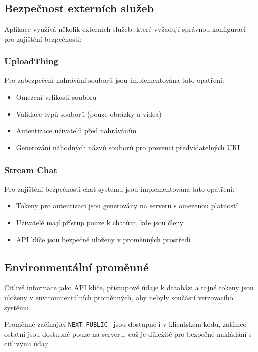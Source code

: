 \documentclass[12pt]{article}
\begin{document}
\subsection{Bezpečnost externích služeb}

Aplikace využívá několik externích služeb, které vyžadují správnou konfiguraci pro zajištění bezpečnosti:

\subsubsection{UploadThing}

Pro zabezpečení nahrávání souborů jsou implementována tato opatření:

\begin{itemize}
    \item Omezení velikosti souborů
    \item Validace typů souborů (pouze obrázky a videa)
    \item Autentizace uživatelů před nahráváním
    \item Generování náhodných názvů souborů pro prevenci předvídatelných URL
\end{itemize}

\subsubsection{Stream Chat}

Pro zajištění bezpečnosti chat systému jsou implementována tato opatření:

\begin{itemize}
    \item Tokeny pro autentizaci jsou generovány na serveru s omezenou platností
    \item Uživatelé mají přístup pouze k chatům, kde jsou členy
    \item API klíče jsou bezpečně uloženy v proměnných prostředí
\end{itemize}

\subsection{Environmentální proměnné}

Citlivé informace jako API klíče, přístupové údaje k databázi a tajné tokeny jsou uloženy v environmentálních proměnných, aby nebyly součástí verzovacího systému.

Proměnné začínající \texttt{NEXT\_PUBLIC\_} jsou dostupné i v klientském kódu, zatímco ostatní jsou dostupné pouze na serveru, což je důležité pro bezpečné nakládání s citlivými údaji.
\end{document}
